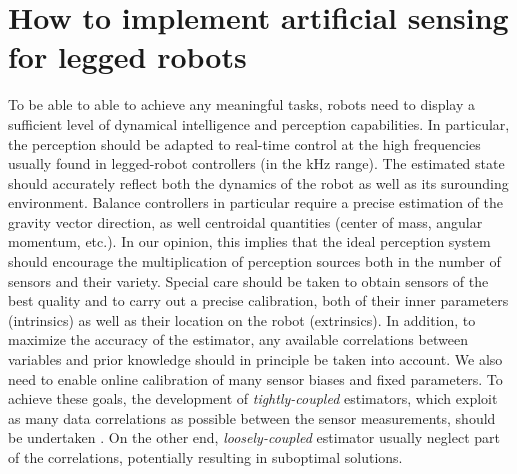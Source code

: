 



\section{How to implement artificial sensing for legged robots}
To be able to able to achieve any meaningful tasks, robots need to display a sufficient level of dynamical intelligence and perception capabilities. 
In particular, the perception should be adapted to real-time control at the high frequencies usually found in legged-robot controllers (in the kHz range).
The estimated state should accurately reflect both the dynamics of the robot as well as its surounding environment. Balance controllers in particular require a precise 
estimation of the gravity vector direction, as well centroidal quantities (center of mass, angular momentum, etc.).
In our opinion, this implies that the ideal perception system should encourage the multiplication of perception sources both in the number of sensors and their variety.
Special care should be taken to obtain sensors of the best quality and to carry out a precise calibration, both of their inner parameters (intrinsics) as well as their
location on the robot (extrinsics). 
In addition, to maximize the accuracy of the estimator, any available correlations between variables and prior knowledge should in principle be taken into account. 
We also need to enable online calibration of many sensor biases and fixed parameters. To achieve these goals, the development of \textit{tightly-coupled} estimators, 
which exploit as many data correlations as possible between the sensor measurements, should be undertaken \cite{nori2015, wisth2021vilens}. On the other end,
\textit{loosely-coupled} estimator usually neglect part of the correlations, potentially resulting in suboptimal solutions.

